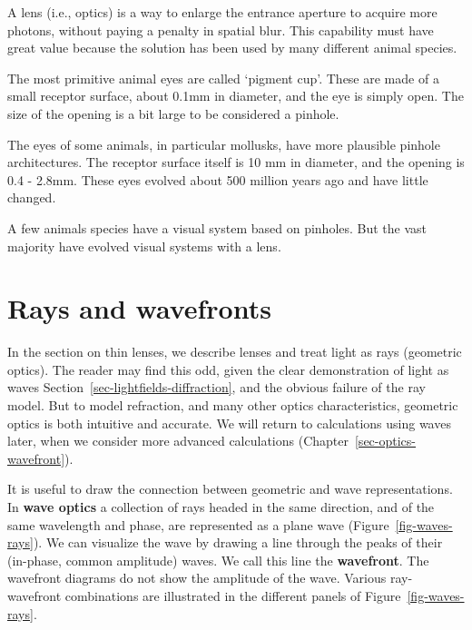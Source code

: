 \documentclass[
  letterpaper,
]{book}
\begin{document}
A lens (i.e., optics) is a way to enlarge the entrance aperture to
acquire more photons, without paying a penalty in spatial blur. This
capability must have great value because the solution has been used by
many different animal species.

\begin{tcolorbox}[enhanced jigsaw, opacitybacktitle=0.6, breakable, bottomtitle=1mm, leftrule=.75mm, colframe=quarto-callout-note-color-frame, colback=white, left=2mm, opacityback=0, title=\textcolor{quarto-callout-note-color}{\faInfo}\hspace{0.5em}{Optics in animals}, toptitle=1mm, bottomrule=.15mm, titlerule=0mm, arc=.35mm, colbacktitle=quarto-callout-note-color!10!white, toprule=.15mm, rightrule=.15mm, coltitle=black]

The most primitive animal eyes are called `pigment cup'. These are made
of a small receptor surface, about 0.1mm in diameter, and the eye is
simply open. The size of the opening is a bit large to be considered a
pinhole.

The eyes of some animals, in particular mollusks, have more plausible
pinhole architectures. The receptor surface itself is 10 mm in diameter,
and the opening is 0.4 - 2.8mm. These eyes evolved about 500 million
years ago and have little changed.

A few animals species have a visual system based on pinholes. But the
vast majority have evolved visual systems with a lens.

\end{tcolorbox}

\section{Rays and wavefronts}\label{rays-and-wavefronts}

In the section on thin lenses, we describe lenses and treat light as
rays (geometric optics). The reader may find this odd, given the clear
demonstration of light as waves
Section~\ref{sec-lightfields-diffraction}, and the obvious failure of
the ray model. But to model refraction, and many other optics
characteristics, geometric optics is both intuitive and accurate. We
will return to calculations using waves later, when we consider more
advanced calculations (Chapter~\ref{sec-optics-wavefront}).

It is useful to draw the connection between geometric and wave
representations. In \textbf{wave optics} a collection of rays headed in
the same direction, and of the same wavelength and phase, are
represented as a plane wave (Figure~\ref{fig-waves-rays}). We can
visualize the wave by drawing a line through the peaks of their
(in-phase, common amplitude) waves. We call this line the
\textbf{wavefront}. The wavefront diagrams do not show the amplitude of
the wave. Various ray-wavefront combinations are illustrated in the
different panels of Figure~\ref{fig-waves-rays}.
\end{document}
